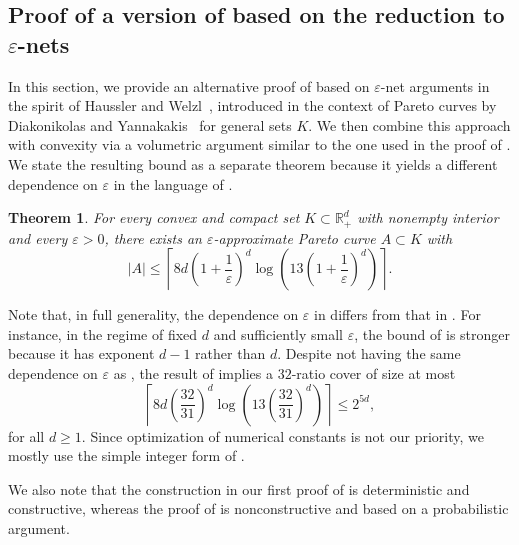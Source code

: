 \documentclass[11pt]{article}
\newcommand{\R}{\mathbb R}
\renewcommand{\le}{\leqslant}
\renewcommand{\ge}{\geqslant}
\newtheorem{theorem}{Theorem}
\theoremstyle{definition}
\theoremstyle{remark}
\begin{document}
\subsection[Proof of a version of Theorem~\ref{thm:ratio-cover} via epsilon-nets]%
{Proof of a version of  based on the reduction to $\varepsilon$-nets}

\label{subsection:epsilonnetproof}

In this section, we provide an alternative proof of  based on $\varepsilon$-net arguments in the spirit of Haussler and Welzl~\cite{haussler1986epsilon}, introduced in the context of Pareto curves by Diakonikolas and Yannakakis~\cite{diakonikolas2010small} for general sets $K$.
We then combine this approach with convexity via a volumetric argument similar to the one used in the proof of . We state the resulting bound as a separate theorem because it yields a different dependence on $\varepsilon$ in the language of .

\begin{theorem}
\label{thm:secratiotheorem}
For every convex and compact set $K \subset \R_+^d$ with nonempty interior and every $ \varepsilon > 0$, there exists an $\varepsilon$-approximate Pareto curve $A \subset K$ with
\[
|A| \le \left\lceil 8d\left(1 + \frac{1}{\varepsilon}\right)^d \log\left(13\left(1 + \frac{1}{\varepsilon}\right)^d\right)\right\rceil.
\]
\end{theorem}

Note that, in full generality, the dependence on $\varepsilon$ in  differs from that in . For instance, in the regime of fixed $d$ and sufficiently small $\varepsilon$, the bound of  is stronger because it has exponent $d-1$ rather than $d$. Despite not having the same dependence on $\varepsilon$ as , the result of  implies a $32$-ratio cover of size at most
\[
\left\lceil 8d\left(\frac{32}{31}\right)^d \log\left(13\left(\frac{32}{31}\right)^d\right)\right\rceil \le 2^{5d},
\]
for all $d \ge 1$.
Since optimization of numerical constants is not our priority, we mostly use the simple integer form of .

We also note that the construction in our first proof of  is deterministic and constructive, whereas the proof of 
is nonconstructive and based on a probabilistic argument.
\end{document}

